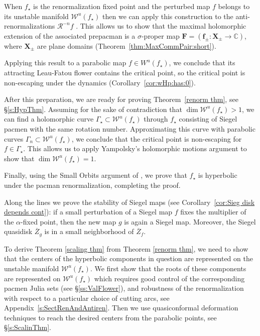 \documentclass[]{amsart}
\newcommand\RR{\mathcal{R}}
\newcommand{\bF}{{\mathbf F}}
\newcommand{\bX}{{\mathbf X}}
\newcommand{\bbf}{{\mathbf f}}
\newcommand{\str}{{\star}}
\newcommand\WW{\mathcal{W}}
\newcommand{\C}{\mathbb{C}}
\theoremstyle{remark}
\numberwithin{equation}{section}
\theoremstyle{definition}
\newcommand{\ra}{\rightarrow}
\begin{document}
When $f_\str$ is the renormalization fixed point and the perturbed
map $ f$ belongs to its unstable
manifold $\WW^u(f_\str)$ then we can apply this construction to the
anti-renormalizations $\RR^{-n} f$ . This allows us to
show that  the maximal holomorphic extension of the associated
prepacman is a $\sigma$-proper map $ \bF=(\bbf_\pm: \bX_\pm \ra \C)$,
where $\bX_\pm$ are plane domains  (Theorem~\ref{thm:MaxCommPair:short}). 
 
 
 
Applying this result to a parabolic map $f\in W^u(f_\str)$,
we conclude that its attracting Leau-Fatou flower  
contains the critical point, so the critical point is non-escaping 
under the dynamics  (Corollary~\ref{cor:wHp:has:0}).


After this preparation,  we are ready for proving Theorem~\ref{renorm thm}, see \S\ref{s:HypThm}.
Assuming for the sake of contradiction that  $\dim \WW^u (f_\str) >1$,
we can find a holomorphic curve $\Gamma_\str \subset  \WW^u (f_\str) $
through $f_\str$ 
consisting of Siegel pacmen with the same rotation number. 
 Approximating  this curve  with  parabolic curves $\Gamma_n\subset \WW^u(f_\str)$,
we conclude that the critical point is non-escaping for $f\in
\Gamma_\str$.
This allows us to apply Yampolsky's holomorphic motions argument \cite{Ya-posmeas} to show that
$\dim \WW^u (f_\str) =1$.  


Finally, using the Small Orbits argument of \cite{L:FCT},
we prove that $f_\str$ is hyperbolic under the pacman renormalization,
completing the proof. 

Along the lines we prove the stability of Siegel maps (see Corollary~\ref{cor:Sieg disk depends cont}): if a small perturbation of a Siegel map $f$ fixes the multiplier of the $\alpha$-fixed point, then the new map $g$ is again a Siegel map. Moreover, the Siegel quasidisk $\overline Z_g$ is in a small neighborhood of $\overline Z_f$.

To derive Theorem \ref{scaling thm} from Theorem \ref{renorm thm}, 
we need to show that the centers of the hyperbolic components in question are represented on the
unstable manifold $\WW^u(f_\str)$. We first show that the roots of these components
are represented on  $\WW^u(f_\str)$
 which requires good control  of the corresponding pacmen Julia sets
 (see \S \ref{ss:ValFlower}), and robustness of the renormalization with respect to a particular choice of cutting arcs, see Appendix~\ref{s:SectRenAndAntiren}.
Then we use quasiconformal deformation techniques to reach the
desired centers from the parabolic points,
see  \S\ref{s:ScalinThm}.
\end{document}
